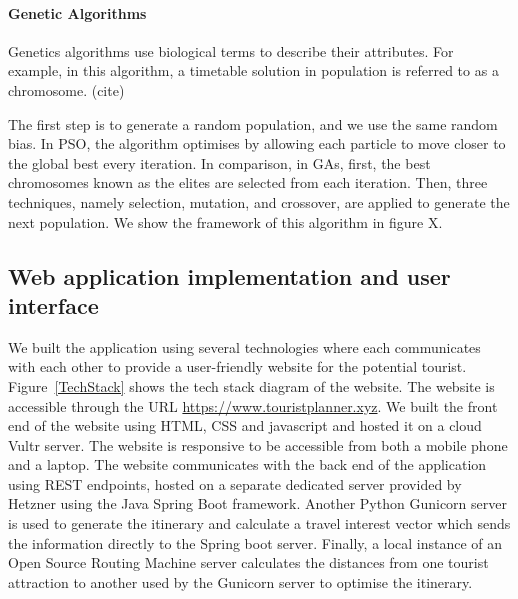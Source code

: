 

















\paragraph{Genetic Algorithms}

Genetics algorithms use biological terms to describe
their attributes. For example, in this algorithm, a
timetable solution in population is referred to as a
chromosome. (cite)

The first step is to generate a random population, and
we use the same random bias. In PSO, the algorithm
optimises by allowing each particle to move closer to
the global best every iteration. In comparison, in
GAs, first, the best chromosomes known as the elites
are selected from each iteration. Then, three
techniques, namely selection, mutation, and crossover,
are applied to generate the next population. We show
the framework of this algorithm in figure X. 


\subsection{Web application implementation and user
interface}

We built the application using several technologies
where each communicates with each other to provide a
user-friendly website for the potential tourist.
Figure~\ref{TechStack} shows the tech stack diagram of the website.
The website is accessible through the URL
\url{https://www.touristplanner.xyz}. We built the front end of the website using HTML, CSS and javascript and hosted it
on a cloud Vultr server. The website is 
responsive to be accessible from both a
mobile phone and a laptop. The website communicates
with the back end of the application using REST
endpoints, hosted on a separate dedicated server
provided by Hetzner using the Java Spring Boot
framework.  Another Python Gunicorn server is used to
generate the itinerary and calculate a travel interest
vector which sends the information directly to the
Spring boot server. Finally, a local instance of an
Open Source Routing Machine server calculates the
distances from one tourist attraction to another used
by the Gunicorn server to optimise the itinerary. 

